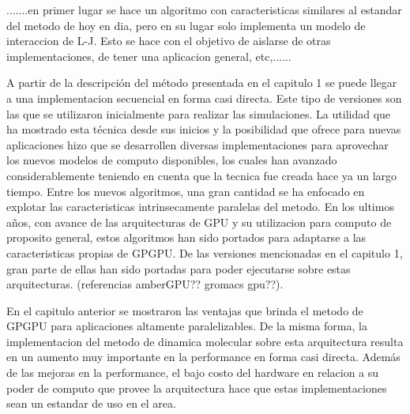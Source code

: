 \documentclass[a4paper,10pt]{report}
\begin{document}
.......en primer lugar se hace un algoritmo con caracteristicas similares al estandar del metodo de hoy en dia, pero en su lugar solo implementa un modelo de interaccion de L-J. 
Esto se hace con el objetivo de aislarse de otras implementaciones, de tener una aplicacion general, etc,......


A partir de la descripción del método presentada en el capitulo 1 se puede llegar a una implementacion secuencial en forma casi directa. Este tipo de versiones son las que se utilizaron inicialmente para realizar las simulaciones.
La utilidad que ha mostrado esta técnica desde sus inicios y la posibilidad que ofrece para nuevas aplicaciones hizo que se desarrollen diversas implementaciones para aprovechar los nuevos modelos de computo disponibles, los cuales han avanzado considerablemente teniendo en cuenta que la tecnica fue creada hace ya un largo tiempo. 
Entre los nuevos algoritmos, una gran cantidad se ha enfocado en explotar las caracteristicas intrinsecamente paralelas del metodo. En los ultimos años, con avance de las arquitecturas de GPU y su utilizacion para computo de proposito general, estos algoritmos han sido portados para adaptarse a las caracteristicas propias de GPGPU.
De las versiones mencionadas en el capitulo 1, gran parte de ellas han sido portadas para poder ejecutarse sobre estas arquitecturas. (referencias amberGPU?? gromacs gpu??).

En el capitulo anterior se mostraron las ventajas que brinda el metodo de GPGPU para aplicaciones altamente paralelizables. De la misma forma,  la implementacion del metodo de dinamica molecular sobre esta arquitectura resulta en un aumento muy importante en la performance en forma casi directa. Además de las mejoras en la performance, el bajo costo del hardware en relacion a su poder de computo que provee la arquitectura hace que estas implementaciones sean un estandar de uso en el area.  
\end{document}
